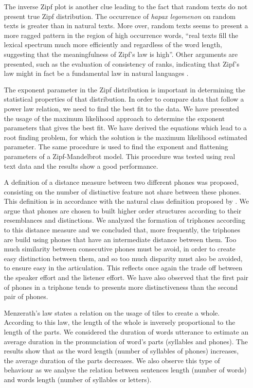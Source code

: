 The inverse Zipf plot is another clue leading to the fact
that random texts do not present true Zipf distribution. 
The occurrence of \emph{hapax legomenon} on random texts is 
greater than in natural texts.
More over, random texts seems to present a more ragged pattern in the region
of high occurrence words, 
``real texts fill the lexical spectrum much more efficiently and
regardless of the word length, suggesting that the meaningfulness of Zipf’s law is high''\citep{cancho2002}.
Other arguments are presented, such as the evaluation of consistency of ranks, 
indicating that Zipf's law might in fact be a fundamental law in natural languages
\citep{cancho2009,cancho2010}.

The exponent parameter in the Zipf distribution is important in determining the
statistical properties of that distribution. In order to compare data that follow
a power law relation, we need to find the best fit to the data. We have presented 
the usage of the maximum likelihood approach to determine the exponent parameters
that gives the best fit. We have derived the equations which lead to a root finding
problem, for which the solution is the maximum likelihood estimated parameter.
The same procedure is used to find the exponent and flattening parameters of
a Zipf-Mandelbrot model. This procedure was tested using real text data
and the results show a good performance. 
 

A definition of a distance measure between two different phones was proposed, 
consisting on the number of distinctive feature not share between these phones.
This definition is in accordance with the natural class definition proposed by \cite{flemming2005}.
We argue that phones are chosen to built higher order structures according to their
resemblances and distinctions. We analyzed the formation of triphones according
to this distance measure and we concluded that, more frequently, the triphones
are build using phones that have an intermediate distance between them. 
Too much similarity between consecutive phones must be avoid, in order to create
easy distinction between them, and so too much disparity must also be avoided,
to ensure easy in the articulation. This reflects once again the trade off
between the speaker effort and the listener effort. We have also observed that
the first pair of phones in a triphone tends to presents more distinctiveness than the
second pair of phones.

Menzerath's law states a relation on the usage of tiles to create a whole.
According to this law, the length of the whole is inversely proportional
to the length of the parts. We considered the duration of words utterance to estimate
an average duration in the pronunciation of word's parts (syllables and phones). 
The results show that as the word length (number of syllables of phones) increases,
the average duration of the parts decreases. We also observe this type of behaviour as
we analyse the relation between sentences length (number of words) and words length 
(number of syllables or letters).

